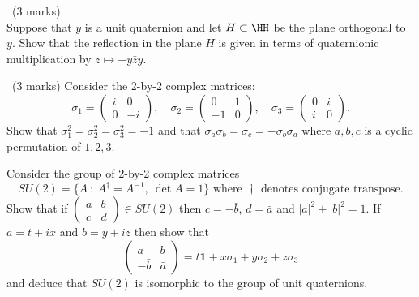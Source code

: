 \documentclass[12pt]{article}
\begin{document}
\newpage

\begin{question}\ (3 marks)\\
  Suppose that $y$ is a unit quaternion and let $H\subset\HH$ be the plane orthogonal to $y$. Show that the reflection in the plane $H$ is given in terms of quaternionic multiplication by $z\mapsto -y\bar{z}y$.
\end{question}

\iffalse
\begin{answer}
  We know that $z\cdot y=\OP{Re}(\bar{z}y)$ so
  \begin{align*}
    z-2(z\cdot y)y&=z-2\OP{Re}(\bar{z}y)y\\
    &=z-y(\bar{z}y+\bar{y}z)y\\
    &=z-y\bar{z}y+y\bar{y}z\mbox{ as }y\mbox{ commutes with real numbers}\\
    &=-y\bar{z}y\mbox{ as }|y|=1.
  \end{align*}
\end{answer}
\newpage
\fi

\vspace{1cm}

\begin{question}\ (3 marks)
  Consider the 2-by-2 complex matrices:
  \[\sigma_1=\left(\begin{array}{cc}
    i & 0\\
    0 & -i
  \end{array}\right),\quad\sigma_2=\left(\begin{array}{cc}
    0 & 1\\
    -1 & 0
  \end{array}\right),\quad\sigma_3=\left(\begin{array}{cc}
    0 & i\\
    i & 0
  \end{array}\right).\]
  Show that $\sigma_1^2=\sigma_2^2=\sigma_3^2=-1$ and that $\sigma_a\sigma_b=\sigma_c=-\sigma_b\sigma_a$ where $a,b,c$ is a cyclic permutation of $1,2,3$.

  Consider the group of 2-by-2 complex matrices
  \[SU(2)=\{A\ :\ A^{\dagger}=A^{-1},\ \det A=1\}\mbox{ where }\dagger\mbox{ denotes conjugate transpose.}\]
  Show that if $\left(\begin{array}{cc}a & b\\ c & d\end{array}\right)\in SU(2)$ then $c=-\bar{b}$, $d=\bar{a}$ and $|a|^2+|b|^2=1$. If $a=t+ix$ and $b=y+iz$ then show that
    \[\left(\begin{array}{cc}a&b\\-\bar{b}&\bar{a}\end{array}\right)=t\mathbf{1}+x\sigma_1+y\sigma_2+z\sigma_3\]
    and deduce that $SU(2)$ is isomorphic to the group of unit quaternions.
\end{question}
\end{document}
